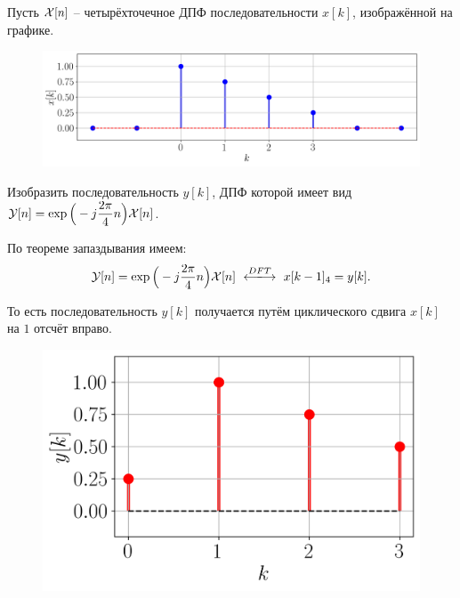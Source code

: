 \section{}
Пусть $\mathcal{X}[n]$ -- четырёхточечное ДПФ последовательности $x[k]$, изображённой на графике.

\begin{figure}[!h]
	\centering
	\includegraphics[width=0.8\columnwidth]{pics/fall/3/3-3-1.png}
	\label{fig:3-3-1}
\end{figure}

Изобразить последовательность $y[k]$, ДПФ которой имеет вид $\mathcal{Y}[n] = \exp\Big(-j \dfrac{2\pi}{4}n\Big)\mathcal{X}[n]$.

По теореме запаздывания имеем:
\begin{equation*}
	\Capit{Y}[n] = \exp\Big(-j \dfrac{2\pi}{4}n\Big)\Capit{X}[n]\ \xlongleftrightarrow{DFT}\ x[k-1]_{4} = y[k].
\end{equation*}

То есть последовательность $y[k]$ получается путём циклического сдвига $x[k]$ на $1$ отсчёт вправо.
\begin{figure}[!h]
	\centering
	\includegraphics[width=0.4\columnwidth]{pics/fall/3/3-3-2.png}
	\label{fig:3-3-2}
\end{figure}

